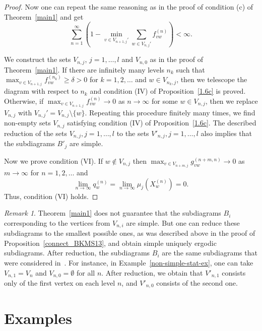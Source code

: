 \documentclass[11pt, english, reqno]{amsart}
\theoremstyle{definition}
\theoremstyle{remark}
\newtheorem{remar}[defin]{Remark}
\theoremstyle{plain}
\numberwithin{equation}{section}
\begin{document}
{\begin{proof}
Now one can repeat the same reasoning as in the proof of condition (c) of 
Theorem~\ref{main1} and get
$$
\sum_{n=1}^\infty \left(1 - \min_{v \in V_{n+1,j}'} \sum_{w \in V_{n,j}'}
f_{vw}^{(n)}\right) < \infty.
$$

We construct the sets $V_{n,j}$, $j = 1, \ldots, l$ and $V_{n,0}$ as in the
proof of Theorem~\ref{main1}. If there are infinitely many levels $n_k$ such
that $\max_{v \in V_{n+1,j}}f_{vw}^{(n_k)} \geq \delta > 0$ for $k = 1,2,
\ldots$ and $w \in V_{n_k,j}$, then we telescope the diagram with respect
to $n_k$ and condition (IV) of Proposition~\ref{1.6c} is proved. Otherwise,
if $\max_{v \in V_{n+1,j}}f_{vw}^{(n)}\rightarrow 0$ as $n \rightarrow
\infty$ for some $w \in V_{n,j}$, then we replace $V_{n,j}$ with $V_{n,j}' =
V_{n,j} \setminus \{w\}$. Repeating this procedure finitely many times, we
find  non-empty sets $V_{n,j}$ satisfying condition (IV) of Proposition~\ref{1.6c}. The described reduction of the sets $V_{n,j}, j = 1, \ldots, l$ to the sets $V'_{n,j}, j = 1, \ldots, l$ also implies that the subdiagrams $B'_j$ are simple.


Now we prove condition (VI). If $w \notin V_{n,j}$ then $\max_{v \in V_{n+m,j}}g_{vw}^{(n+m,n)}
\rightarrow 0$ as $m \rightarrow \infty$ for $n = 1,2,\ldots$ and
$$
\lim_{n \rightarrow \infty} q_w^{(n)} = \lim_{n \rightarrow \infty}
\mu_j(X_w^{(n)}) = 0.
$$
Thus, condition (VI) holds.
\end{proof}

\begin{remar}
Theorem~\ref{main1} does not guarantee that the subdiagrams $B_i$
 corresponding to the vertices from $V_{n,i}$ are simple. But one can reduce
  these subdiagrams to the smallest possible ones, as was described above in
the proof of Proposition~\ref{connect_BKMS13}, and obtain simple uniquely 
ergodic subdiagrams. After reduction, the subdiagrams $B_i$ are the same 
subdiagrams that were considered in~\cite{BezuglyiKwiatkowskiMedynetsSolomyak2013}.  For instance, in 
Example~\ref{non-simple-stat-ex}, one can take $V_{n,1} = V_n$ and 
$V_{n,0} = \emptyset$ for all $n$. After reduction, we obtain that 
$V'_{n,1}$ consists only of the first vertex on each level $n$, and $V'_{n,0}$ 
consists of the second one.
\end{remar}

\section{Examples}\label{sect 6}

}
\end{document}
